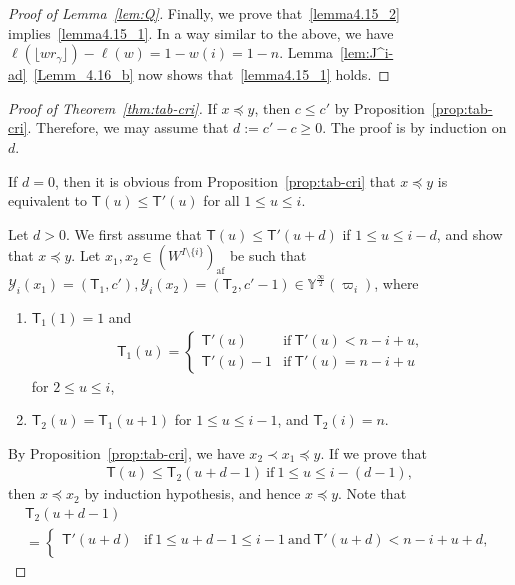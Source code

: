 \documentclass[ALCO,ThmDefs,Unicode,epreuves]{cedram}
\newcommand{\si}{\frac{\infty}{2}}
\DeclareMathOperator{\af}{af}
\begin{document}
\begin{proof}[Proof of Lemma~\ref{lem:Q}]
Finally, we prove that~\ref{lemma4.15_2} implies~\ref{lemma4.15_1}. 
In a way similar to the above, 
we have 
$\ell(\lfloor w r_{\gamma} \rfloor) - \ell(w) = 1 - w(i) = 1 - n$. 
Lemma~\ref{lem:J^i-ad}~\ref{Lemm_4.16_b} now shows that~\ref{lemma4.15_1} holds.
\end{proof}

\begin{proof}[Proof of Theorem~\ref{thm:tab-cri}]
If 
$x \preceq y$, 
then 
$c \leq c'$ 
by Proposition~\ref{prop:tab-cri}.
Therefore, we may assume that 
$d := c' - c \geq 0$. 
The proof is by induction on $d$. 

If $d = 0$, then it is obvious from Proposition~\ref{prop:tab-cri} that 
$x \preceq y$ 
is equivalent to 
$\mathsf{T}(u) \leq \mathsf{T}'(u)$
for all 
$1 \leq u \leq i$. 

Let $d > 0$. 
We first assume that 
$\mathsf{T}(u) \leq \mathsf{T}'(u+d)$ 
if 
$1 \leq u \leq i-d$, 
and show that 
$x \preceq y$. 
Let 
$x_1 , x_2 \in (W^{I \setminus \{ i \}})_{\af}$ 
be such that 
$\mathcal{Y}_i(x_1) = (\mathsf{T}_1 , c'), \mathcal{Y}_i(x_2) = (\mathsf{T}_2 , c'-1) \in \mathbb{Y}^{\si}(\varpi_i)$, 
where 
\begin{enumerate}[label=(\arabic*)]
\item
$\mathsf{T}_1(1) = 1$ and 
\begin{align}
\mathsf{T}_1(u) 
=
\begin{cases}
\mathsf{T}'(u) 
&
\text{if} \ 
\mathsf{T}'(u) < n-i+u, \\[2mm]
\mathsf{T}'(u) - 1
&
\text{if} \ 
\mathsf{T}'(u) = n-i+u
\end{cases}
\end{align}
for $2 \leq u \leq i$, 
\item
$\mathsf{T}_2(u) = \mathsf{T}_1(u+1)$ 
for 
$1 \leq u \leq i-1$, 
and 
$\mathsf{T}_2(i) = n$.
\end{enumerate}
By Proposition~\ref{prop:tab-cri}, 
we have 
$x_2 \prec x_1 \preceq y$. 
If we prove that 
\begin{align} \label{eq:T_2>T}
\mathsf{T}(u) \leq \mathsf{T}_2(u+d-1) \ 
\text{if} \ 
1 \leq u \leq i- (d-1), 
\end{align}
then 
$x \preceq x_2$
by induction hypothesis, 
and hence 
$x \preceq y$. 
Note that 
\begin{multline}
\mathsf{T}_2(u+d-1) \\
=
\begin{cases}
\mathsf{T}'(u+d) 
&
\text{if} \ 
1 \leq u+d-1 \leq i-1 \ 
\text{and} \ 
\mathsf{T}'(u+d) < n-i+u+d , \\%

\end{cases}
\end{multline}
\end{proof}
\end{document}
